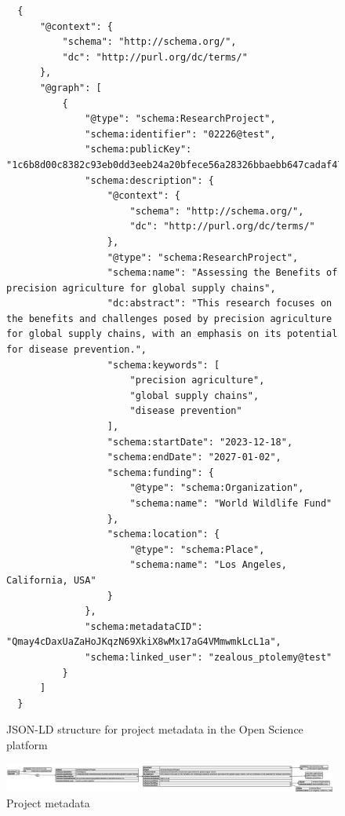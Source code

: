 \documentclass[final]{rc-book-2.14}
\begin{document}
\begin{figure}[h]
    \centering
    \caption{JSON-LD structure for project metadata in the Open Science platform}
    \label{jsonld:project}
    \begin{verbatim}
  {
      "@context": {
          "schema": "http://schema.org/",
          "dc": "http://purl.org/dc/terms/"
      },
      "@graph": [
          {
              "@type": "schema:ResearchProject",
              "schema:identifier": "02226@test",
              "schema:publicKey": "1c6b8d00c8382c93eb0dd3eeb24a20bfece56a28326bbaebb647cadaf4750520",
              "schema:description": {
                  "@context": {
                      "schema": "http://schema.org/",
                      "dc": "http://purl.org/dc/terms/"
                  },
                  "@type": "schema:ResearchProject",
                  "schema:name": "Assessing the Benefits of precision agriculture for global supply chains",
                  "dc:abstract": "This research focuses on the benefits and challenges posed by precision agriculture for global supply chains, with an emphasis on its potential for disease prevention.",
                  "schema:keywords": [
                      "precision agriculture",
                      "global supply chains",
                      "disease prevention"
                  ],
                  "schema:startDate": "2023-12-18",
                  "schema:endDate": "2027-01-02",
                  "schema:funding": {
                      "@type": "schema:Organization",
                      "schema:name": "World Wildlife Fund"
                  },
                  "schema:location": {
                      "@type": "schema:Place",
                      "schema:name": "Los Angeles, California, USA"
                  }
              },
              "schema:metadataCID": "Qmay4cDaxUaZaHoJKqzN69XkiX8wMx17aG4VMmwmkLcL1a",
              "schema:linked_user": "zealous_ptolemy@test"
          }
      ]
  }
  \end{verbatim}
\end{figure}



\begin{figure}[htbp]
    \centering
    \includegraphics[width=0.98\textwidth, keepaspectratio]{fig/project_metadata.eps}
    \caption{Project metadata}
    \label{fig:project_metadata}
\end{figure}
\end{document}
